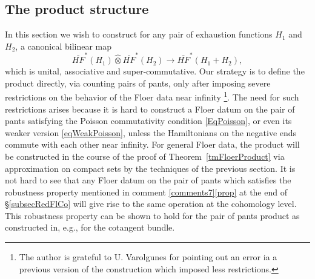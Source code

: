 \documentclass[11pt]{amsart}
\theoremstyle{definition}
\theoremstyle{remark}
\begin{document}
\subsection{The product structure}\label{subsecFloerProd}
In this section we wish to construct for any pair of exhaustion functions $H_1$ and $H_2$, a canonical bilinear map
\[
\overline{HF}^*(H_1)\hat{\otimes}\overline{HF}^*(H_2)\to\overline{HF}^*(H_1+H_2),
\]
which is unital, associative and super-commutative. Our strategy is to define the product directly, via counting pairs of pants, only after imposing severe restrictions on the behavior of the Floer data near infinity \footnote{The author is grateful to U. Varolgunes for pointing out an error ia a previous version of the construction which imposed less restrictions.}. The need for such restrictions arises because it is hard to construct a Floer datum on the pair of pants satisfying the Poisson commutativity condition \eqref{EqPoisson}, or even its weaker version \eqref{eqWeakPoisson}, unless the Hamiltonians on the negative ends commute with each other near infinity. For general Floer data, the product will be constructed in the course of the proof of Theorem~\ref{tmFloerProduct} via approximation on compact sets by the techniques of the previous section. It is not hard to see that any Floer datum on the pair of pants which satisfies the robustness property mentioned in comment \ref{comments7}\ref{prop} at the end of \S\ref{subsecRedFlCo} will give rise to the same operation at the cohomology level. This robustness property can be shown to hold for the pair of pants product as constructed in, e.g., \cite{Abouzaid2013} for the cotangent bundle.
\end{document}
